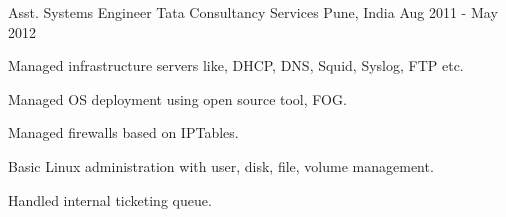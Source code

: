 \begin{cventries}
  \cventry
    {Asst. Systems Engineer} %
    {Tata Consultancy Services} %
    {Pune, India} %
    {Aug 2011 - May 2012} %
    {
      \begin{cvitems} %
        \item {Managed infrastructure servers like, DHCP, DNS, Squid, Syslog, FTP etc.}
        \item {Managed OS deployment using open source tool, FOG.}
        \item {Managed firewalls based on IPTables.}
        \item {Basic Linux administration with user, disk, file, volume management.}
        \item {Handled internal ticketing queue.}
      \end{cvitems}
    }

\end{cventries}
